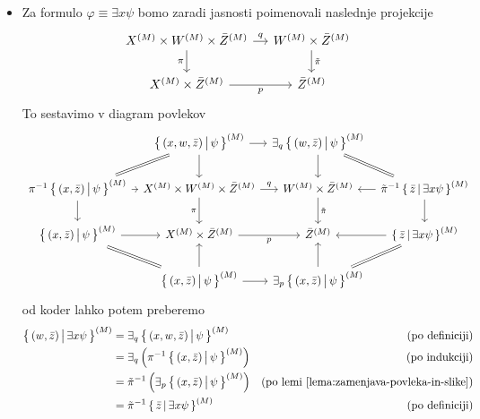 \documentclass[../kategoricna_logika.tex]{subfiles}
\begin{document}
\begin{dokaz}
\begin{itemize}
    \item Za formulo $\varphi \equiv \exists x \psi$ bomo zaradi
      jasnosti poimenovali naslednje projekcije
      \begin{equation*}
        \begin{tikzcd}[column sep=small]
          \interp{X} \times \interp{W} \times \interp{\bar{Z}} \ar[d, "\pi"'] \ar[r, "q"] &
          \interp{W} \times \interp{\bar{Z}} \ar[d, "\tilde{\pi}"] \\
          \interp{X} \times \interp{\bar{Z}} \ar[r, "p"'] &
          \interp{\bar{Z}}
        \end{tikzcd}
      \end{equation*}
      To sestavimo v diagram povlekov {\scriptsize
        \begin{equation*}
          \begin{tikzcd}[column sep=tiny]
            & \setb{(x,w,\bar{z})}{\psi}^{(M)} \ar[dl, equal] \ar[d] \ar[r] & \exists_q \setb{(w,\bar{z})}{\psi}^{(M)} \ar[d] \ar[dr, equal] & \\
            \pi^{-1}\setb{(x,\bar{z})}{\psi}^{(M)} \ar[d] \ar[r] & X^{(M)} \times W^{(M)} \times \bar{Z}^{(M)} \ar[d, "\pi"'] \ar[r, "q"] & W^{(M)} \times \bar{Z}^{(M)} \ar[d, "\tilde{\pi}"] & \tilde{\pi}^{-1} \setb{\bar{z}}{\exists x \psi}^{(M)} \ar[l] \ar[d] \\
            \setb{(x,\bar{z})}{\psi}^{(M)} \ar[dr, equal] \ar[r] & X^{(M)} \times \bar{Z}^{(M)} \ar[r, "p"'] & \bar{Z}^{(M)}  & \setb{\bar{z}}{\exists x \psi}^{(M)} \ar[l] \ar[dl, equal] \\
            & \setb{(x,\bar{z})}{\psi}^{(M)} \ar[u] \ar[r] & \exists_p
            \setb{(x,\bar{z})}{\psi}^{(M)} \ar[u] &
          \end{tikzcd}
        \end{equation*}
      } od koder lahko potem preberemo
      \begin{align*}
        \left\lbrace\, (w, \bar{z}) \,\middle|\, \exists x \psi \,\right\rbrace^{(M)} &= \exists_q \left\lbrace\, (x,w,\bar{z}) \,\middle|\, \psi \,\right\rbrace^{(M)} &\text{(po definiciji)} \\
                                                  &= \exists_q \left( \pi^{-1} \left\lbrace\, (x, \bar{z}) \,\middle|\, \psi \,\right\rbrace^{(M)}\right) &\text{(po indukciji)} \\
                                                  &= \tilde{\pi}^{-1} \left( \exists_p \left\lbrace\, (x,\bar{z}) \,\middle|\, \psi \,\right\rbrace^{(M)} \right) &\text{(po lemi \ref{lema:zamenjava-povleka-in-slike})} \\
                                                  &= \tilde{\pi}^{-1} \left\lbrace\, \bar{z} \,\middle|\, \exists x \psi \,\right\rbrace^{(M)} &\text{(po definiciji)}
      \end{align*}
    \end{itemize}
  \end{dokaz}
\end{document}
